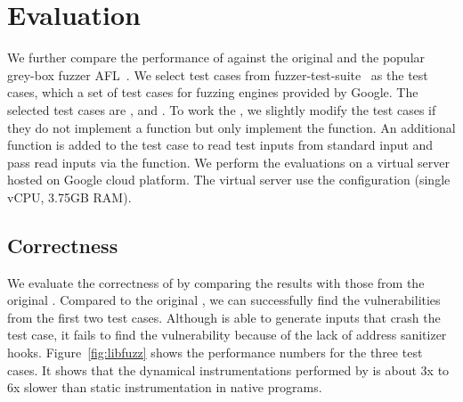 
\section{Evaluation}
\label{sec:eval}

We further compare the performance of \sys against the original \libfuzzer and the popular grey-box fuzzer AFL~\cite{AFL}.
We select test cases from fuzzer-test-suite~\cite{fuzzer-test-suite} as the test cases, which a set of test cases for fuzzing engines provided by Google.
The selected test cases are ,  and .
To work the \sys, we slightly modify the test cases if they do not implement a  function but only implement the  function.
An additional  function is added to the test case to read test inputs from standard input and pass read inputs via the  function.
%
We perform the evaluations on a virtual server hosted on Google cloud platform. The virtual server use the  configuration (single vCPU, 3.75GB RAM).

%

\subsection{Correctness}

We evaluate the correctness of \sys by comparing the results with those from the original \libfuzzer.
Compared to the original \libfuzzer, we can successfully find the vulnerabilities from the first two test cases.
Although \sys is able to generate inputs that crash the test case, it fails to find the vulnerability because of the lack of address sanitizer hooks.
%
Figure~\ref{fig:libfuzz} shows the performance numbers for the three test cases. It shows that the dynamical instrumentations performed by \sys is about 3x to 6x slower than static instrumentation in native programs.

